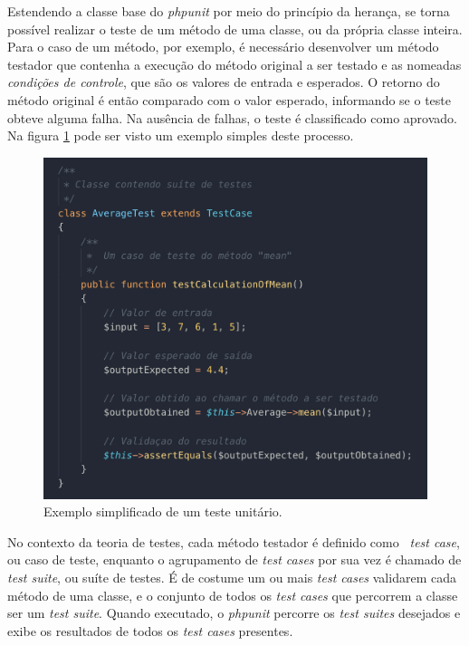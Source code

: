 Estendendo a classe base do \emph{phpunit} por meio do princípio da herança, se torna possível realizar o teste de um método de uma classe, ou da própria classe inteira. Para o caso de um método, por exemplo, é necessário desenvolver um método testador que contenha a execução do método original a ser testado e as nomeadas \emph{condições de controle}, que são os valores de entrada e esperados. O retorno do método original é então comparado com o valor esperado, informando se o teste obteve alguma falha. Na ausência de falhas, o teste é classificado como aprovado. Na figura \ref{fig:phpunit-framework} pode ser visto um exemplo simples deste processo.

\begin{figure}[H]
    \centering
    \includegraphics[width=13cm]{source/4-solucao/images/phpunit-framework.png}
    \caption{Exemplo simplificado de um teste unitário.}
    \label{fig:phpunit-framework}
\end{figure}

No contexto da teoria de testes, cada método testador é definido como \emph{~test case}, ou caso de teste, enquanto o agrupamento de \emph{test cases} por sua vez é chamado de \emph{test suite}, ou suíte de testes. É de costume um ou mais \emph{test cases} validarem cada método de uma classe, e o conjunto de todos os \emph{test cases} que percorrem a classe ser um \emph{test suite}. Quando executado, o \emph{phpunit} percorre os \emph{test suites} desejados e exibe os resultados de todos os \emph{test cases} presentes.

